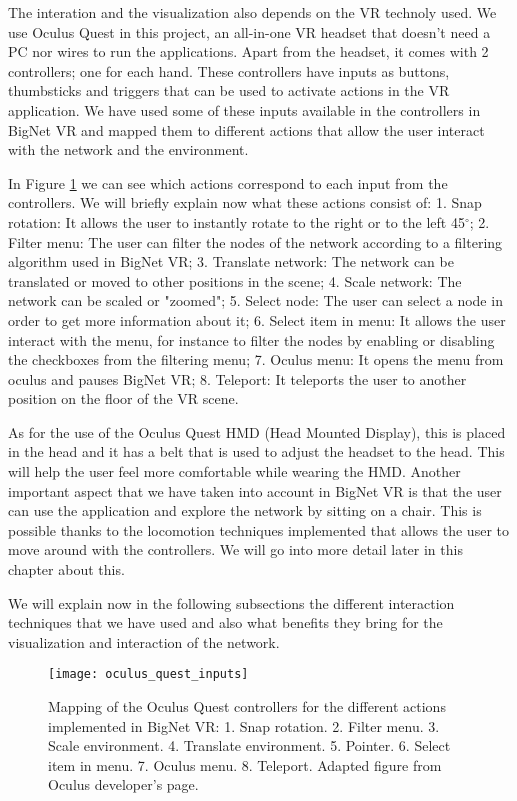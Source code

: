 The interation and the visualization also depends on the VR technoly used. We use Oculus Quest in this project, an all-in-one VR headset that doesn't need a PC nor wires to run the applications. Apart from the headset, it comes with 2 controllers; one for each hand. These controllers have inputs as buttons, thumbsticks and triggers that can be used to activate actions in the VR application. We have used some of these inputs available in the controllers in BigNet VR and mapped them to different actions that allow the user interact with the network and the environment.

In Figure \ref{fig:oculus_quest_inputs} we can see which actions correspond to each input from the controllers. We will briefly explain now what these actions consist of: 1. Snap rotation: It allows the user to instantly rotate to the right or to the left 45$^{\circ}$; 2. Filter menu: The user can filter the nodes of the network according to a filtering algorithm used in BigNet VR; 3. Translate network: The network can be translated or moved to other positions in the scene; 4. Scale network: The network can be scaled or "zoomed"; 5. Select node: The user can select a node in order to get more information about it; 6. Select item in menu: It allows the user interact with the menu, for instance to filter the nodes by enabling or disabling the checkboxes from the filtering menu; 7. Oculus menu: It opens the menu from oculus and pauses BigNet VR; 8. Teleport: It teleports the user to another position on the floor of the VR scene.

As for the use of the Oculus Quest HMD (Head Mounted Display), this is placed in the head and it has a belt that is used to adjust the headset to the head. This will help the user feel more comfortable while wearing the HMD. Another important aspect that we have taken into account in BigNet VR is that the user can use the application and explore the network by sitting on a chair. This is possible thanks to the locomotion techniques implemented that allows the user to move around with the controllers. We will go into more detail later in this chapter about this.

We will explain now in the following subsections the different interaction techniques that we have used and also what benefits they bring for the visualization and interaction of the network.

\begin{figure}[h!]
    \centering%
    \texttt{[image: oculus\_quest\_inputs]}
    \caption{Mapping of the Oculus Quest controllers for the different actions implemented in BigNet VR: 1. Snap rotation. 2. Filter menu. 3. Scale environment. 4. Translate environment. 5. Pointer. 6. Select item in menu. 7. Oculus menu. 8. Teleport. Adapted figure from Oculus developer's page\cite{oculus_inputs}.}
    \label{fig:oculus_quest_inputs}
\end{figure}%

